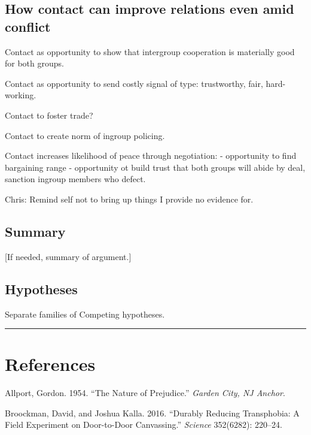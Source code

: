 \documentclass[11pt]{article}
\begin{document}
\hypertarget{how-contact-can-improve-relations-even-amid-conflict}{%
\subsection{How contact can improve relations even amid
conflict}\label{how-contact-can-improve-relations-even-amid-conflict}}

Contact as opportunity to show that intergroup cooperation is materially
good for both groups.

Contact as opportunity to send costly signal of type: trustworthy, fair,
hard-working.

Contact to foster trade?

Contact to create norm of ingroup policing.

Contact increases likelihood of peace through negotiation: - opportunity
to find bargaining range - opportunity ot build trust that both groups
will abide by deal, sanction ingroup members who defect.

Chris: Remind self not to bring up things I provide no evidence for.

\hypertarget{summary}{%
\subsection{Summary}\label{summary}}

{[}If needed, summary of argument.{]}

\hypertarget{hypotheses}{%
\subsection{Hypotheses}\label{hypotheses}}

Separate families of Competing hypotheses.

\begin{center}\rule{0.5\linewidth}{\linethickness}\end{center}

\hypertarget{references}{%
\section{References}\label{references}}

\hypertarget{refs}{}
\leavevmode\hypertarget{ref-allport1954prejudice}{}%
Allport, Gordon. 1954. ``The Nature of Prejudice.'' \emph{Garden City,
NJ Anchor}.

\leavevmode\hypertarget{ref-broockman2016durably}{}%
Broockman, David, and Joshua Kalla. 2016. ``Durably Reducing
Transphobia: A Field Experiment on Door-to-Door Canvassing.''
\emph{Science} 352(6282): 220--24.
\end{document}
